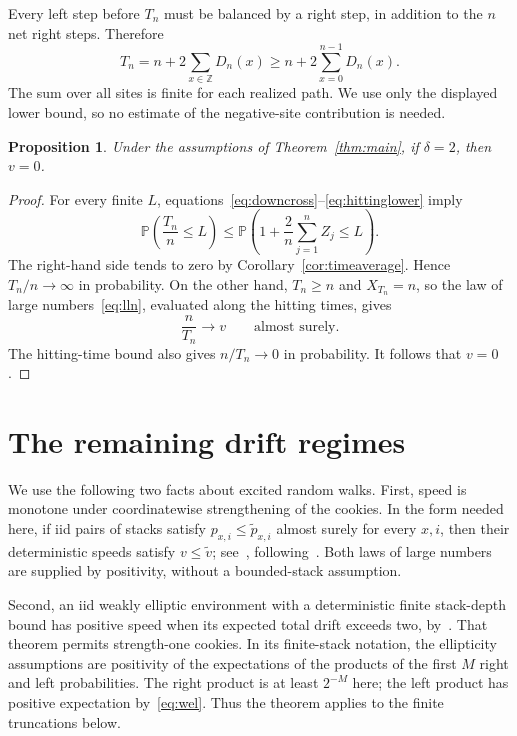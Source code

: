 \documentclass[11pt]{amsart}
\numberwithin{equation}{section}
\newtheorem{proposition}[theorem]{Proposition}
\theoremstyle{remark}
\newcommand{\Pp}{\mathbb P}
\newcommand{\Z}{\mathbb Z}
\begin{document}
Every left step before $T_n$ must be balanced by a right step, in addition to the $n$ net right steps. Therefore
\begin{equation}\label{eq:hittinglower}
 T_n=n+2\sum_{x\in\Z}D_n(x)
 \ge n+2\sum_{x=0}^{n-1}D_n(x).
\end{equation}
The sum over all sites is finite for each realized path. We use only the displayed lower bound, so no estimate of the negative-site contribution is needed.

\begin{proposition}\label{prop:critical}
Under the assumptions of Theorem~\ref{thm:main}, if $\delta=2$, then $v=0$.
\end{proposition}

\begin{proof}
For every finite $L$, equations~\eqref{eq:downcross}--\eqref{eq:hittinglower} imply
\begin{equation}\label{eq:probcompare}
 \Pp\left(\frac{T_n}{n}\le L\right)
 \le\Pp\left(1+\frac2n\sum_{j=1}^nZ_j\le L\right).
\end{equation}
The right-hand side tends to zero by Corollary~\ref{cor:timeaverage}. Hence $T_n/n\to\infty$ in probability. On the other hand, $T_n\ge n$ and $X_{T_n}=n$, so the law of large numbers~\eqref{eq:lln}, evaluated along the hitting times, gives
\[
 \frac{n}{T_n}\longrightarrow v\qquad\text{almost surely}.
\]
The hitting-time bound also gives $n/T_n\to0$ in probability. It follows that $v=0$.
\end{proof}

\section{The remaining drift regimes}\label{sec:remaining}

We use the following two facts about excited random walks. First, speed is monotone under coordinatewise strengthening of the cookies. In the form needed here, if iid pairs of stacks satisfy $p_{x,i}\le\widetilde p_{x,i}$ almost surely for every $x,i$, then their deterministic speeds satisfy $v\le\widetilde v$; see~\cite[Proposition~4.2]{KZ13}, following~\cite[Theorem~17]{Zerner05}. Both laws of large numbers are supplied by positivity, without a bounded-stack assumption.

Second, an iid weakly elliptic environment with a deterministic finite stack-depth bound has positive speed when its expected total drift exceeds two, by~\cite[Theorem~2]{KZ08}. That theorem permits strength-one cookies. In its finite-stack notation, the ellipticity assumptions are positivity of the expectations of the products of the first $M$ right and left probabilities. The right product is at least $2^{-M}$ here; the left product has positive expectation by~\eqref{eq:wel}. Thus the theorem applies to the finite truncations below.
\end{document}
